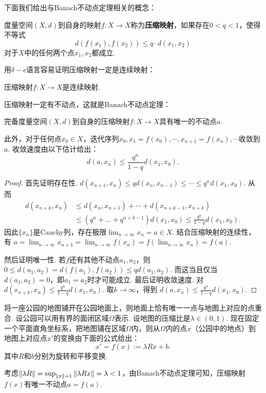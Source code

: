 下面我们给出与Banach不动点定理相关的概念：

\begin{definition}[压缩映射]
度量空间$(X,d)$到自身的映射$f:X\to X$称为\textbf{压缩映射}，如果存在$0<q<1$，使得不等式
    \[d(f(x_1),f(x_2))\le q\cdot d(x_1,x_2)\]
对于$X$中的任何两个点$x_1,x_2$都成立.
\end{definition}

用$\delta-\epsilon$语言容易证明压缩映射一定是连续映射：
\begin{lemma}\label{lemma:contraction-continuous}
    压缩映射$f:X\to X$是连续映射.
\end{lemma}

压缩映射一定有不动点，这就是Banach不动点定理：
\begin{theorem}\label{thm:banach-fixed-point}

完备度量空间$(X,d)$到自身的压缩映射$f:X\to X$具有唯一的不动点$a$. 

此外，对于任何点$x_0\in X$，迭代序列$x_0,x_1=f(x_0),\cdots,x_{n+1}=f(x_n),\cdots$收敛到$a$. 收敛速度由以下估计给出：
\[d(a,x_n)\le \frac{q^n}{1-q}d(x_1,x_0).\]
\end{theorem}

\begin{proof}
首先证明存在性. $d(x_{n+1},x_n)\le qd(x_n,x_{n-1})\le \cdots\le q^nd(x_1,x_0).$
从而
\begin{align*}
d(x_{n+k},x_n)&\le d(x_n,x_{n+1})+\cdots+d(x_{n+k-1},x_{n+k})\\
&\leq(q^n+\dots+q^{n+k-1})d(x_1,x_0)\le \frac{q^{n}}{1-q}d(x_1,x_0).
\end{align*}
因此$\{x_n\}$是Cauchy列，存在极限$\lim_{n\to\infty} x_n=a\in X$.
结合压缩映射的连续性，有
$a=\lim_{n\to\infty}x_{n+1} = \lim_{n\to\infty}f(x_n)=f(\lim_{n\to\infty}x_n)=f(a).$

然后证明唯一性. 若$f$还有其他不动点$a_1,a_2$，则
$0\le d(a_1,a_2)=d(f(a_1),f(a_2))\le qd(a_1,a_2).$
而这当且仅当$d(a_1,a_2)=0$，即$a_1=a_2$时才可能成立.
最后证明收敛速度. 对
$d(x_{n+k},x_n)\le \frac{q^n}{1-q}d(x_1,x_0).$
取$k\to\infty$，得到
$d(a,x_n)\le \frac{q^n}{1-q}d(x_1,x_0).$
\end{proof}

\begin{example}[落在地面上的地图]
将一座公园的地图铺开在公园地面上，则地面上恰有唯一一点与地图上对应的点重合. 设公园可以用有界的面闭区域$\Omega$表示. 设地图的压缩比是$\lambda\in(0,1)$. 现在固定一个平面直角坐标系，把地图铺在区域$\Omega$内，则从$\Omega$内的点$x$（公园中的地点）到地图上对应点$x'$的变换由下面的公式给出：
\[x' = f(x) := \lambda Rx + b.\]
其中$R$和$b$分别为旋转和平移变换. 

考虑$\left\|\lambda R\right\|=\sup_{\left\|x\right\|=1}\left\|\lambda Rx\right\|=\lambda<1$，由Banach不动点定理可知，压缩映射$f(x)$有唯一不动点$a=f(a)$.
\end{example}

